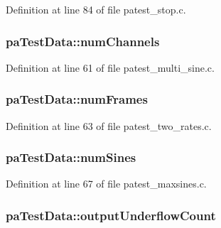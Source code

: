 Definition at line 84 of file patest\+\_\+stop.\+c.

\subsubsection[{\texorpdfstring{num\+Channels}{numChannels}}]{ pa\+Test\+Data\+::num\+Channels}\hypertarget{structpa_test_data_a13e83fe2a80bd86874185c2db2bcd2f6}{}\label{structpa_test_data_a13e83fe2a80bd86874185c2db2bcd2f6}


Definition at line 61 of file patest\+\_\+multi\+\_\+sine.\+c.

\subsubsection[{\texorpdfstring{num\+Frames}{numFrames}}]{ pa\+Test\+Data\+::num\+Frames}\hypertarget{structpa_test_data_a39b8d955e62641a67afd9e50c7224a59}{}\label{structpa_test_data_a39b8d955e62641a67afd9e50c7224a59}


Definition at line 63 of file patest\+\_\+two\+\_\+rates.\+c.

\subsubsection[{\texorpdfstring{num\+Sines}{numSines}}]{ pa\+Test\+Data\+::num\+Sines}\hypertarget{structpa_test_data_a6448805a40842affd160d0221efcdf17}{}\label{structpa_test_data_a6448805a40842affd160d0221efcdf17}


Definition at line 67 of file patest\+\_\+maxsines.\+c.

\subsubsection[{\texorpdfstring{output\+Underflow\+Count}{outputUnderflowCount}}]{ pa\+Test\+Data\+::output\+Underflow\+Count}\hypertarget{structpa_test_data_acd16baa4873f67dd413628a2f45bdfa1}{}\label{structpa_test_data_acd16baa4873f67dd413628a2f45bdfa1}


